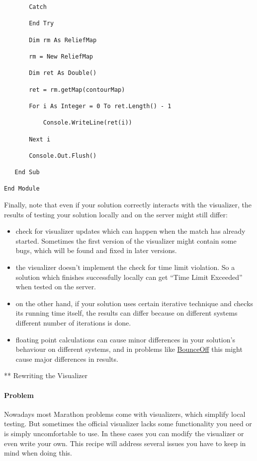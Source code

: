 \begin{verbatim}
       Catch

       End Try

       Dim rm As ReliefMap

       rm = New ReliefMap

       Dim ret As Double()

       ret = rm.getMap(contourMap)

       For i As Integer = 0 To ret.Length() - 1

           Console.WriteLine(ret(i))

       Next i

       Console.Out.Flush()

   End Sub

End Module
\end{verbatim}

Finally, note that even if your solution correctly interacts with the
visualizer, the results of testing your solution locally and on the
server might still differ:

\begin{itemize}
\item
  check for visualizer updates which can happen when the match has
  already started. Sometimes the first version of the visualizer might
  contain some bugs, which will be found and fixed in later versions.
\item
  the visualizer doesn't implement the check for time limit violation.
  So a solution which finishes successfully locally can get ``Time Limit
  Exceeded'' when tested on the server.
\item
  on the other hand, if your solution uses certain iterative technique
  and checks its running time itself, the results can differ because on
  different systems different number of iterations is done.
\item
  floating point calculations can cause minor differences in your
  solution's behaviour on different systems, and in problems like
  \href{http://apps.topcoder.com/forums/?module=Thread\&threadID=670892\&start=0}{BounceOff}
  this might cause major differences in results.
\end{itemize}

** Rewriting the Visualizer

\hypertarget{problem-2}{%
\paragraph{Problem}\label{problem-2}}

Nowadays most Marathon problems come with visualizers, which simplify
local testing. But sometimes the official visualizer lacks some
functionality you need or is simply uncomfortable to use. In these cases
you can modify the visualizer or even write your own. This recipe will
address several issues you have to keep in mind when doing this.

